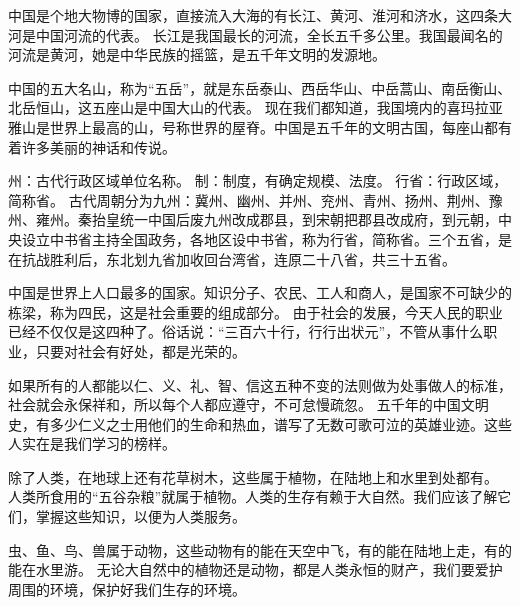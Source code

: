 \documentclass[avery5371,grid]{flashcards}
\begin{document}
{中国是个地大物博的国家，直接流入大海的有长江、黄河、淮河和济水，这四条大河是中国河流的代表。} %
{长江是我国最长的河流，全长五千多公里。我国最闻名的河流是黄河，她是中华民族的摇篮，是五千年文明的发源地。} %

{中国的五大名山，称为“五岳”，就是东岳泰山、西岳华山、中岳蒿山、南岳衡山、北岳恒山，这五座山是中国大山的代表。} %
{现在我们都知道，我国境内的喜玛拉亚雅山是世界上最高的山，号称世界的屋脊。中国是五千年的文明古国，每座山都有着许多美丽的神话和传说。} %

{州：古代行政区域单位名称。 制：制度，有确定规模、法度。 行省：行政区域，简称省。} %
{古代周朝分为九州：冀州、幽州、并州、兖州、青州、扬州、荆州、豫州、雍州。秦抬皇统一中国后废九州改成郡县，到宋朝把郡县改成府，到元朝，中央设立中书省主持全国政务，各地区设中书省，称为行省，简称省。三个五省，是在抗战胜利后，东北划九省加收回台湾省，连原二十八省，共三十五省。} %

{中国是世界上人口最多的国家。知识分子、农民、工人和商人，是国家不可缺少的栋梁，称为四民，这是社会重要的组成部分。} %
{由于社会的发展，今天人民的职业已经不仅仅是这四种了。俗话说：“三百六十行，行行出状元”，不管从事什么职业，只要对社会有好处，都是光荣的。} %


{如果所有的人都能以仁、义、礼、智、信这五种不变的法则做为处事做人的标准，社会就会永保祥和，所以每个人都应遵守，不可怠慢疏忽。} %
{五千年的中国文明史，有多少仁义之士用他们的生命和热血，谱写了无数可歌可泣的英雄业迹。这些人实在是我们学习的榜样。} %


{除了人类，在地球上还有花草树木，这些属于植物，在陆地上和水里到处都有。} %
{人类所食用的“五谷杂粮”就属于植物。人类的生存有赖于大自然。我们应该了解它们，掌握这些知识，以便为人类服务。} %

{虫、鱼、鸟、兽属于动物，这些动物有的能在天空中飞，有的能在陆地上走，有的能在水里游。} %
{无论大自然中的植物还是动物，都是人类永恒的财产，我们要爱护周围的环境，保护好我们生存的环境。} %
\end{document}
